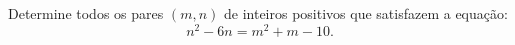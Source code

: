 Determine todos os pares $(m, n)$ de inteiros positivos que satisfazem a equação:
$$n^2 - 6n = m^2 + m - 10.$$